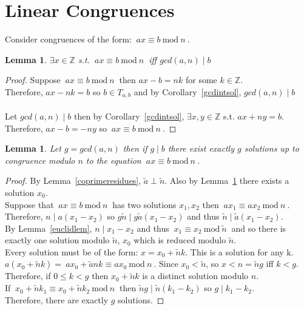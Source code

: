 \documentclass[12pt]{extarticle}
\renewcommand\qedsymbol{$\square$}
\newcommand{\divides}{\mid}
\newcommand{\Z}{\mathbb{Z}}
\newtheorem{lemma}[theorem]{Lemma}
\newenvironment{lproof}{\begin{proof} \renewcommand{\qedsymbol}{}}{\end{proof}}
\renewcommand{\mod}[3]{\: #1 \equiv #2 \: \mathrm{mod} \: #3 \:}
\begin{document}
\section{Linear Congruences}

Consider congruences of the form: $\mod{ax}{b}{n}$. 

\begin{lemma}
\label{congsolutions}
$\exists x \in \Z$ s.t. $\mod{ax}{b}{n}$ iff $gcd(a,n) \divides b$
\end{lemma}

\begin{lproof}
Suppose $\mod{ax}{b}{n}$ then $ax - b = nk$ for some $k \in \Z$. \\
Therefore, $ax - nk = b$ so $b \in T_{a,b}$ and by Corollary~\ref{gcdintsol}, $gcd(a,n) \divides b$ \\\\
Let $gcd(a,n) \divides b$ then by Corollary~\ref{gcdintsol}, $\exists x,y \in \Z$ s.t. $ax + ny = b$. \\
Therefore, $ax - b = -ny$ so $\mod{ax}{b}{n}$. 
\end{lproof}

\begin{lemma}
\label{numsoltocongruence}
Let $g = gcd(a,n)$ then if $g \divides b$ there exist exactly $g$ solutions up to congruence modulo $n$ to the equation $\mod{ax}{b}{n}$.
\end{lemma}

\begin{lproof}
By Lemma~\ref{coprimeresidues}, $\tilde{a} \perp \tilde{n}$. Also by Lemma~\ref{congsolutions} there exists a solution $x_0$.  \\
Suppose that $\mod{ax}{b}{n}$ has two solutions $x_1,x_2$ then $\mod{ax_1}{ax_2}{n}$. \\ Therefore, $n \divides a(x_1-x_2)$ so $g\tilde{n} \divides g\tilde{a}(x_1-x_2)$ and thus $\tilde{n} \divides \tilde{a}(x_1-x_2).$ \\ By Lemma~\ref{euclidlem}, $n \divides x_1 - x_2$ and thus $\mod{x_1}{x_2}{\tilde{n}}$ and so there is exactly one solution modulo $\tilde{n}$, $x_0$ which is reduced modulo $\tilde{n}$. \\
Every solution must be of the form: $x = x_0 + \tilde{n}k$. This is a solution for any k. $a(x_0 + \tilde{n}k) = \mod{ax_0 + \tilde{a}nk}{ax_0}{n}$. Since $x_0 < \tilde{n}$, so $x < n = \tilde{n}g$ iff $k < g$. \\
Therefore, if $0 \le k < g$ then $x_0 + \tilde{n}k$ is a distinct solution modulo $n$. \\ If $\mod{x_0 + \tilde{n}k_1}{x_0 + \tilde{n}k_2}{n}$ then $\tilde{n}g \divides \tilde{n}(k_1-k_2)$ so $g \divides k_1 - k_2$. \\ Therefore, there are exactly $g$ solutions.
\end{lproof}
\end{document}
